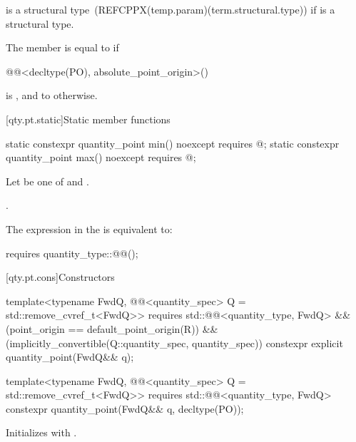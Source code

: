 \pnum
{} is a structural type~(REFCPPX(temp.param)(term.structural.type))
if  is a structural type.

\pnum
The member  is equal to  if
\begin{codeblock}
@@<decltype(PO), absolute_point_origin>()
\end{codeblock}
is , and
to  otherwise.

[qty.pt.static]{Static member functions}

\begin{itemdecl}
static constexpr quantity_point min() noexcept
  requires @\seebelownc@;
static constexpr quantity_point max() noexcept
  requires @\seebelownc@;
\end{itemdecl}

\begin{itemdescr}
\pnum
Let  be one of  and .

\pnum
\returns
{}.

\pnum
\remarks
The expression in the  is equivalent to:
\begin{codeblock}
requires { quantity_type::@@(); }
\end{codeblock}
\end{itemdescr}

[qty.pt.cons]{Constructors}

\begin{itemdecl}
template<typename FwdQ, @@<quantity_spec> Q = std::remove_cvref_t<FwdQ>>
  requires std::@@<quantity_type, FwdQ> &&
           (point_origin == default_point_origin(R)) &&
           (implicitly_convertible(Q::quantity_spec, quantity_spec))
constexpr explicit quantity_point(FwdQ&& q);

template<typename FwdQ, @@<quantity_spec> Q = std::remove_cvref_t<FwdQ>>
  requires std::@@<quantity_type, FwdQ>
constexpr quantity_point(FwdQ&& q, decltype(PO));
\end{itemdecl}

\begin{itemdescr}
\pnum
\effects
Initializes  with .
\end{itemdescr}

